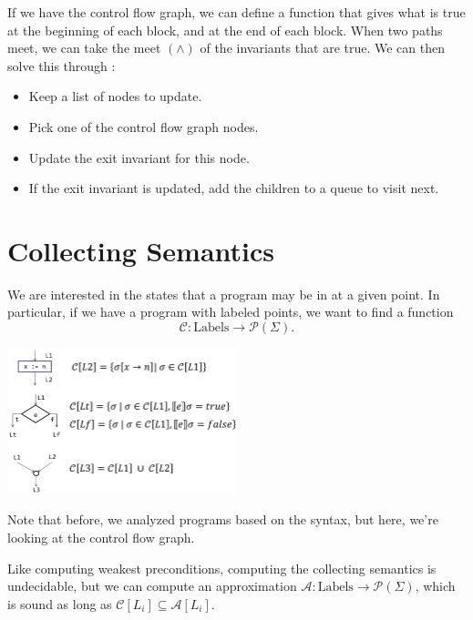 \documentclass[class=scrartcl]{standalone}
\begin{document}
If we have the control flow graph,
we can define a function that gives
what is true at the beginning of each block,
and at the end of each block.
When two paths meet, we can take the meet \((\wedge)\)
of the invariants that are true.
We can then solve this through :
\begin{itemize}[nosep]
  \item Keep a list of nodes to update.
  \item Pick one of the control flow graph nodes.
  \item Update the exit invariant for this node.
  \item If the exit invariant is updated,
        add the children to a queue to visit next.
\end{itemize}

\section{Collecting Semantics}
We are interested in the states that a program may be in at a given point.
In particular, if we have a program with labeled points,
we want to find a function
\[
  \mathcal C \colon \text{Labels} \to \mathcal P(\Sigma).
\]
\begin{center}
  \includegraphics[width=0.5\textwidth]{collecting-semantics.png}
\end{center}

Note that before, we analyzed programs based on the syntax,
but here, we're looking at the control flow graph.

Like computing weakest preconditions,
computing the collecting semantics is undecidable,
but we can compute an approximation
\(\mathcal A \colon \text{Labels} \to \mathcal P(\Sigma)\),
which is sound as long as \(\mathcal C[L_i] \subseteq \mathcal A[L_i]\).
\end{document}
